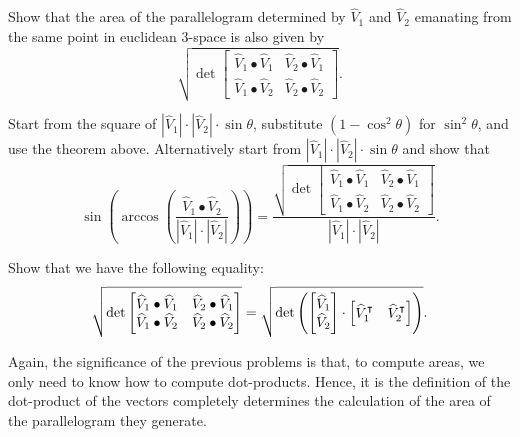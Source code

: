 \documentclass{ximera}
\begin{document}
\begin{problem}
\label{9}Show that the area of the parallelogram determined by $\hat{V}_{1}$
and $\hat{V}_{2}$ emanating from the same point in euclidean $3$-space is also
given by%
\[
\sqrt{\det
\begin{bmatrix}
\hat{V}_{1}\bullet\hat{V}_{1} & \hat{V}_{2}\bullet\hat{V}_{1}\\
\hat{V}_{1}\bullet\hat{V}_{2} & \hat{V}_{2}\bullet\hat{V}_{2}%
\end{bmatrix}}.
\]

\begin{hint}
Start from the square of
$|\hat{V}_{1}|\cdot|\hat{V}_{2}|\cdot\sin\theta$, substitute $\left(
1-\cos^{2}\theta\right)$ for $\sin^{2}\theta$, and use the theorem
above. Alternatively start from
$|\hat{V}_{1}|\cdot|\hat{V}_{2}|\cdot\sin\theta$ and show that%
\[
\sin\left(  \arccos\left(  \frac{\hat{V}_{1}\bullet\hat{V}%
_{2}}{\left\vert \hat{V}_{1}\right\vert \cdot\left\vert \hat{V}_{2}\right\vert
}\right)  \right)  
=\frac{\sqrt{\det
    \begin{bmatrix}
      \hat{V}_{1}\bullet\hat{V}_{1} & \hat{V}_{2}\bullet\hat{V}_{1}\\
      \hat{V}_{1}\bullet\hat{V}_{2} & \hat{V}_{2}\bullet\hat{V}_{2}
    \end{bmatrix}
  }
}{\left\vert\hat{V}_{1}\right\vert \cdot\left\vert
  \hat{V}_{2}\right\vert }.
\]
\end{hint}

\end{problem}

\begin{problem}
Show that we have the following equality:
\[
\sqrt{
  \det
\begin{bmatrix}
\hat{V}_{1}\bullet\hat{V}_{1} & \hat{V}_{2}\bullet\hat{V}_{1}\\
\hat{V}_{1}\bullet\hat{V}_{2} & \hat{V}_{2}\bullet\hat{V}_{2}%
\end{bmatrix}}
=
\sqrt{
  \det\left(
\begin{bmatrix}
\hat{V}_{1} \\
\hat{V}_{2}
\end{bmatrix}
\cdot
\begin{bmatrix}
\hat{V}_{1}^\transpose  & \hat{V}_{2}^\transpose 
\end{bmatrix}\right)}.
\]

\end{problem}

Again, the significance of the previous problems is that, to compute
areas, we only need to know how to compute dot-products. Hence, it is
the definition of the dot-product of the vectors completely determines
the calculation of the area of the parallelogram they generate.
\end{document}
